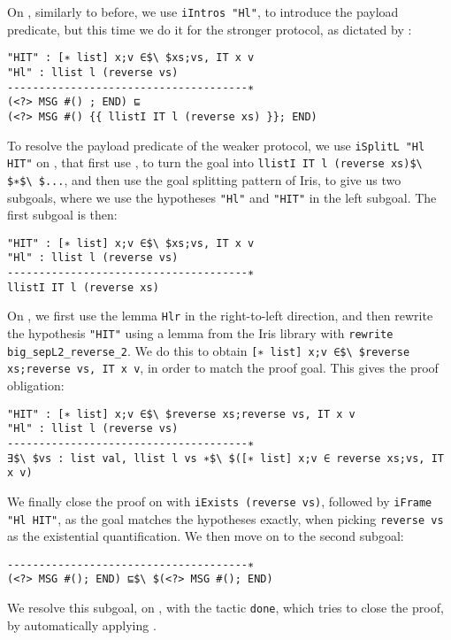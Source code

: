 On , similarly to before, we use
\lstinline{iIntros "Hl"}, to introduce the payload predicate,
but this time we do it for the stronger protocol,
as dictated by :
\begin{lstlisting}
"HIT" : [∗ list] x;v ∈$\ $xs;vs, IT x v
"Hl" : llist l (reverse vs)
--------------------------------------∗
(<?> MSG #() ; END) ⊑
(<?> MSG #() {{ llistI IT l (reverse xs) }}; END)
\end{lstlisting}
To resolve the payload predicate of the weaker protocol, we use
\lstinline{iSplitL "Hl HIT"} on , that first use
, to turn the goal into
\lstinline{llistI IT l (reverse xs)$\ $∗$\ $...}, and then use the goal splitting pattern
of Iris, to give us two subgoals, where we use the hypotheses \lstinline{"Hl"} and
\lstinline{"HIT"} in the left subgoal.
The first subgoal is then:
\begin{lstlisting}
"HIT" : [∗ list] x;v ∈$\ $xs;vs, IT x v
"Hl" : llist l (reverse vs)
--------------------------------------∗
llistI IT l (reverse xs)
\end{lstlisting}
On , we first use the lemma \lstinline{Hlr}
in the right-to-left
direction, and then rewrite the hypothesis \lstinline{"HIT"} using a
lemma from the Iris library with \lstinline{rewrite big_sepL2_reverse_2}.
We do this to obtain \lstinline{[∗ list] x;v ∈$\ $reverse xs;reverse vs, IT x v},
in order to match the proof goal.
This gives the proof obligation:
\begin{lstlisting}
"HIT" : [∗ list] x;v ∈$\ $reverse xs;reverse vs, IT x v
"Hl" : llist l (reverse vs)
--------------------------------------∗
∃$\ $vs : list val, llist l vs ∗$\ $([∗ list] x;v ∈ reverse xs;vs, IT x v)
\end{lstlisting}
We finally close the proof on 
with \lstinline{iExists (reverse vs)}, followed by
\lstinline{iFrame "Hl HIT"}, as the goal matches the hypotheses exactly,
when picking \lstinline{reverse vs} as the existential quantification.
We then move on to the second subgoal:
\begin{lstlisting}
--------------------------------------∗
(<?> MSG #(); END) ⊑$\ $(<?> MSG #(); END)
\end{lstlisting}
We resolve this subgoal, on ,
with the tactic \lstinline{done},
which tries to close the proof, by automatically applying
.
